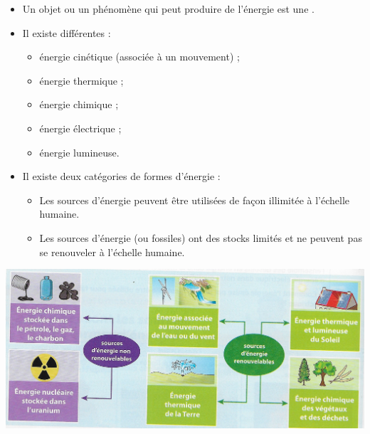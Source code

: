 \begin{mybilan}
	\begin{itemize}
		
		\item Un objet ou un phénomène qui peut produire de l'énergie est une .
				
		\item Il existe différentes  :
		
			\begin{itemize}
				\item énergie cinétique (associée à un mouvement) ;
				\item énergie thermique ;
				\item énergie chimique ;
				\item énergie électrique ;
				\item énergie lumineuse.
			\end{itemize}
		
		\item Il existe deux catégories de formes d'énergie :
			\begin{itemize}
				\item Les sources d'énergie  peuvent être utilisées de façon illimitée à l'échelle humaine.
				\item Les sources d'énergie  (ou fossiles) ont des stocks limités et ne peuvent pas se renouveler à l'échelle humaine.
			\end{itemize}
	\end{itemize}


	\begin{center}
		\includegraphics[scale=0.8]{img/types_energie}
	\end{center}
\end{mybilan}
